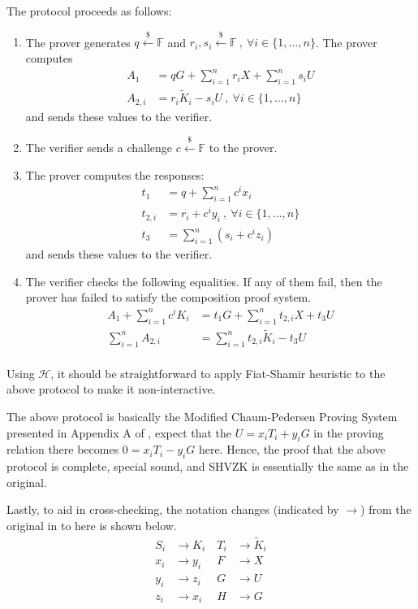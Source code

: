 \documentclass{article}
\begin{document}
The protocol proceeds as follows:
\begin{enumerate}
\item The prover generates $q\xleftarrow{\$}\mathbb{F}$ and $r_i, s_i \xleftarrow{\$}\mathbb{F}\ ,\ \forall i\in\{1,\ldots,n\}$. The prover computes
\begin{align*}
A_1 &= qG + \sum_{i=1}^n{r_i X} + \sum_{i=1}^n{s_i U} \\
A_{2,i} &= r_i \tilde{K}_i - s_i U\ ,\ \forall i\in\{1,\ldots,n\}
\end{align*}
and sends these values to the verifier.
\item The verifier sends a challenge $c\xleftarrow{\$}\mathbb{F}$ to the prover.
\item The prover computes the responses:
\begin{align*}
t_1 &= q + \sum_{i=1}^n c^i x_i \\
t_{2,i} &= r_i + c^i y_i\ ,\ \forall i\in\{1,\ldots,n\} \\
t_3 &= \sum_{i=1}^n (s_i + c^i z_i)
\end{align*}
and sends these values to the verifier.
\item The verifier checks the following equalities. If any of them fail, then the prover has failed to satisfy the composition proof system.
\begin{align*}
A_1 + \sum_{i=1}^{n}{c^i K_i} &= t_1 G + \sum_{i=1}^n{t_{2,i} X} + t_3 U \\
\sum_{i=1}^{n} A_{2,i} &= \sum_{i=1}^{n} t_{2,i}\tilde{K}_i - t_3 U \\
\end{align*}
\end{enumerate}
Using $\mathcal{H}$, it should be straightforward to apply Fiat-Shamir heuristic \cite{fiat-shamir} to the above protocol to make it non-interactive.

The above protocol is basically the Modified Chaum-Pedersen Proving System presented in Appendix A of \cite{lelantus-spark}, expect that the $U = x_i T_i + y_i G$ in the proving relation there becomes $0 = x_i T_i - y_i G$ here. Hence, the proof that the above protocol is complete, special sound, and SHVZK is essentially the same as in the original.

Lastly, to aid in cross-checking, the notation changes (indicated by $\rightarrow$) from the original in \cite{lelantus-spark} to here is shown below.
\begin{align*}
S_i &\rightarrow K_i&\ T_i &\rightarrow \tilde{K}_i \\
x_i &\rightarrow y_i&\ F &\rightarrow X \\
y_i &\rightarrow z_i&\ G &\rightarrow U \\
z_i &\rightarrow x_i&\ H &\rightarrow G
\end{align*}


\end{document}
